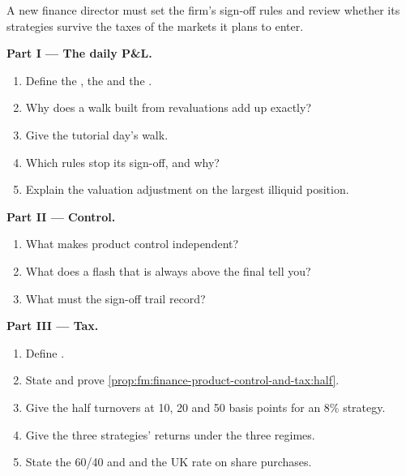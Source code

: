 \begin{problem}\label{pb:fm:finance-product-control-and-tax:1}
A new finance director must set the firm's sign-off rules and review whether its strategies survive the taxes of the markets it plans to enter.

\medskip\noindent\textbf{Part I --- The daily P\&L.}
\begin{enumerate}
\item Define the , the  and the .
\item Why does a walk built from revaluations add up exactly?
\item Give the tutorial day's walk.
\item Which rules stop its sign-off, and why?
\item Explain the valuation adjustment on the largest illiquid position.
\end{enumerate}

\medskip\noindent\textbf{Part II --- Control.}
\begin{enumerate}[resume]
\item What makes product control independent?
\item What does a flash that is always above the final tell you?
\item What must the sign-off trail record?
\end{enumerate}

\medskip\noindent\textbf{Part III --- Tax.}
\begin{enumerate}[resume]
\item Define .
\item State and prove \cref{prop:fm:finance-product-control-and-tax:half}.
\item Give the half turnovers at 10, 20 and 50 basis points for an 8\% strategy.
\item Give the three strategies' returns under the three regimes.
\item State the 60/40 and  and the UK rate on share purchases.
\end{enumerate}


\end{problem}

